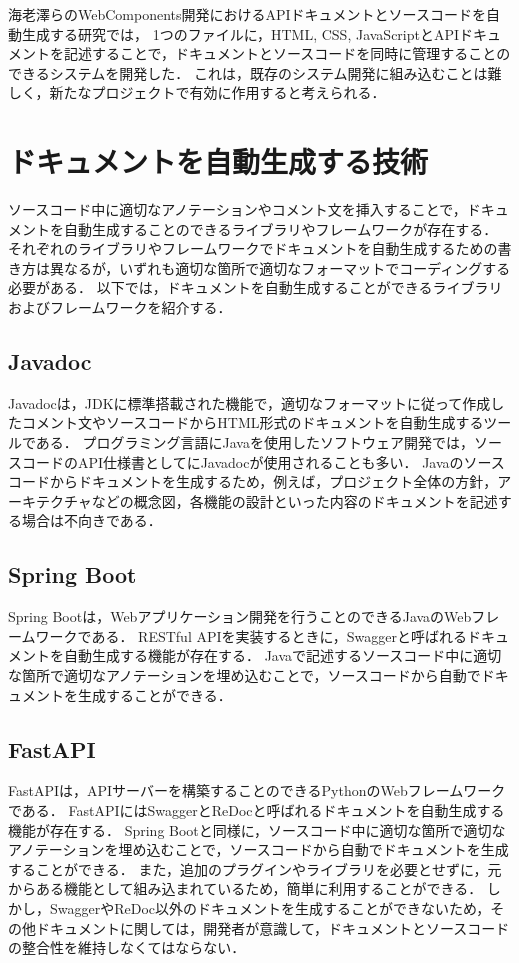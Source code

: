 海老澤らのWebComponents開発におけるAPIドキュメントとソースコードを自動生成する研究\cite{webcomponents}では，
1つのファイルに，HTML, CSS, JavaScriptとAPIドキュメントを記述することで，ドキュメントとソースコードを同時に管理することのできるシステムを開発した．
これは，既存のシステム開発に組み込むことは難しく，新たなプロジェクトで有効に作用すると考えられる．

\section{ドキュメントを自動生成する技術}
ソースコード中に適切なアノテーションやコメント文を挿入することで，ドキュメントを自動生成することのできるライブラリやフレームワークが存在する．
それぞれのライブラリやフレームワークでドキュメントを自動生成するための書き方は異なるが，いずれも適切な箇所で適切なフォーマットでコーディングする必要がある．
以下では，ドキュメントを自動生成することができるライブラリおよびフレームワークを紹介する．

\subsection{Javadoc}
Javadocは，JDKに標準搭載された機能で，適切なフォーマットに従って作成したコメント文やソースコードからHTML形式のドキュメントを自動生成するツールである．
プログラミング言語にJavaを使用したソフトウェア開発では，ソースコードのAPI仕様書としてにJavadoc\cite{javadoc}が使用されることも多い．
Javaのソースコードからドキュメントを生成するため，例えば，プロジェクト全体の方針，アーキテクチャなどの概念図，各機能の設計といった内容のドキュメントを記述する場合は不向きである．

\subsection{Spring Boot}
Spring Boot\cite{spring}は，Webアプリケーション開発を行うことのできるJavaのWebフレームワークである．
RESTful APIを実装するときに，Swagger\cite{swagger}と呼ばれるドキュメントを自動生成する機能が存在する．
Javaで記述するソースコード中に適切な箇所で適切なアノテーションを埋め込むことで，ソースコードから自動でドキュメントを生成することができる．

\subsection{FastAPI}
FastAPI\cite{fastapi}は，APIサーバーを構築することのできるPythonのWebフレームワークである．
FastAPIにはSwaggerとReDoc\cite{redoc}と呼ばれるドキュメントを自動生成する機能が存在する．
Spring Bootと同様に，ソースコード中に適切な箇所で適切なアノテーションを埋め込むことで，ソースコードから自動でドキュメントを生成することができる．
また，追加のプラグインやライブラリを必要とせずに，元からある機能として組み込まれているため，簡単に利用することができる．
しかし，SwaggerやReDoc以外のドキュメントを生成することができないため，その他ドキュメントに関しては，開発者が意識して，ドキュメントとソースコードの整合性を維持しなくてはならない．

